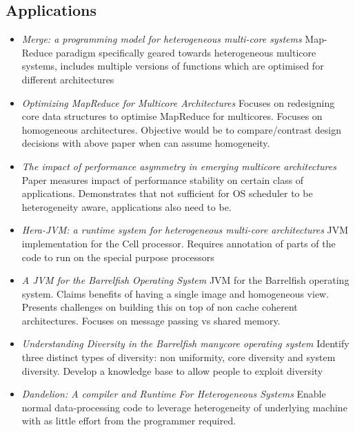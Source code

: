 \subsection{Applications}
\begin{itemize}
\item \emph{Merge: a programming model for heterogeneous multi-core systems}
Map-Reduce paradigm specifically geared towards heterogeneous multicore systems,
includes multiple versions of functions which are optimised for different architectures \cite{LCWM:08}
\item \emph{Optimizing MapReduce for Multicore Architectures} Focuses on redesigning
core data structures to optimise MapReduce for multicores. Focuses on homogeneous
architectures. Objective would be to compare/contrast design decisions with
above paper when can assume homogeneity. \cite{Mao10optimizingmapreduce}
\item \emph{The impact of performance asymmetry in emerging multicore architectures}
Paper measures impact of performance stability on certain class of applications.
Demonstrates that not sufficient for OS scheduler to be heterogeneity aware,
applications also need to be. \cite{Balakrishnan:2005:IPA:1069807.1070012} 
\item \emph{Hera-JVM: a runtime system for heterogeneous multi-core 
architectures} JVM implementation for the Cell processor. Requires annotation
of parts of the code to run on the special purpose processors \cite{McIlroy:2010:HRS:1869459.1869478}
\item \emph{A JVM for the Barrelfish Operating System} JVM for the Barrelfish
operating system. Claims benefits of having a single image and homogeneous view. 
Presents challenges on building this on top of non cache coherent architectures.
Focuses on message passing vs shared memory. \cite{maasjvm} 
\item \emph{Understanding Diversity in the Barrelfish manycore operating system}
Identify three distinct types of diversity: non uniformity, core diversity and 
system diversity. Develop a knowledge base to allow people to exploit
diversity \cite{Schupbach08embracingdiversity}
\item \emph{Dandelion: A compiler and Runtime For Heterogeneous Systems} 
Enable normal data-processing code to leverage heterogeneity of underlying
machine with as little effort from the programmer required. \cite{Rossbach:2013:DCR:2517349.2522715}
\end{itemize}


